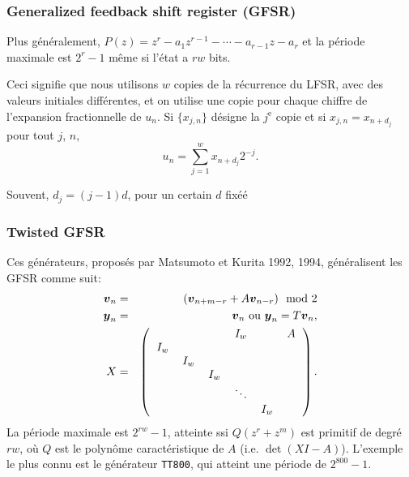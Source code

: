 \documentclass[t,usepdftitle=false]{beamer}
\def\bv{\boldsymbol{v}}
\def\by{\boldsymbol{y}}
\begin{document}
\begin{frame}
\frametitle{Generalized feedback shift register (GFSR)}

Plus généralement, ${P(z)} = z^r - a_1 z^{r-1} - \cdots - a_{r-1} z - a_r$
et la période maximale est $2^r-1$ même si l'état a $rw$ bits.

\mbox{}

Ceci signifie que nous utilisons $w$ copies de la récurrence du LFSR, avec des valeurs initiales différentes, et on utilise
une copie pour chaque chiffre de l'expansion fractionnelle de $u_n$.
Si $\lbrace x_{j,n} \rbrace$ désigne la $j^{\mbox{e}}$ copie et si
$x_{j,n} = x_{n+d_j}$ pour tout $j$, $n$,
\[
u_n = \sum_{j = 1}^w x_{n+d_j}2^{-j}.
\]

\mbox{}

Souvent, $d_j = (j-1)d$, pour un certain $d$ fixéé

\end{frame}

\begin{frame}
\frametitle{Twisted GFSR}

Ces générateurs, proposés par Matsumoto et Kurita 1992, 1994,
généralisent les GFSR comme suit:
\begin {eqnarray*}
 \bv_n &=& (\bv_{n+m-r} + A \bv_{n-r}) \mod 2 \\
 {\by_n} &=& \bv_{n} \mbox{ ou } {\by_n} = {T} \bv_{n}, \\
   X &=&
\left(
\begin{tabular}{cccccc}
   &        &       &  $I_w$ &     & $A$ \\
$I_w$&      &       &        &     &    \\
   &  $I_w$ &       &        &     &    \\
   &        & $I_w$ &        &     &    \\
   &        &       &$\ddots$&     &    \\
   &        &       &        &$I_w$&
\end{tabular}
\right).
\end {eqnarray*}
La période maximale est $2^{rw}-1$, atteinte ssi 
$Q(z^r + z^m)$ est primitif de degré $rw$, où ${Q}$ est le polynôme 
caractéristique de $A$ (i.e. $\det (XI-A)$).
L'exemple le plus connu est le générateur {\tt TT800}, qui atteint une
période de $2^{800}-1$.

\end{frame}
\end{document}
